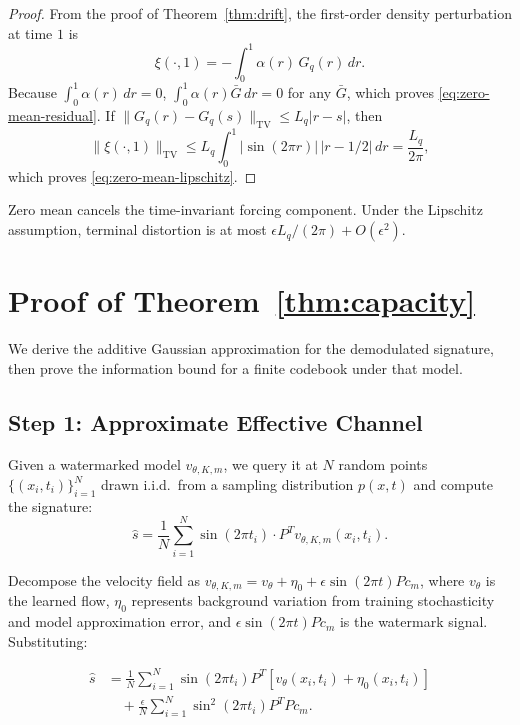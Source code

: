 \documentclass[11pt]{article}
\newcommand{\TV}{\mathrm{TV}}
\begin{document}
\begin{proof}
From the proof of Theorem~\ref{thm:drift}, the first-order density
perturbation at time $1$ is
\begin{equation}
\xi(\cdot,1)
=
-\int_0^1 \alpha(r)\,
G_q(r)\,dr .
\end{equation}
Because $\int_0^1\alpha(r)\,dr=0$,
$\int_0^1\alpha(r)\bar G\,dr=0$ for any $\bar G$, which proves
\eqref{eq:zero-mean-residual}. If
$\|G_q(r)-G_q(s)\|_{\TV}\le L_q|r-s|$, then
\[
\|\xi(\cdot,1)\|_{\TV}
\le
L_q\int_0^1 |\sin(2\pi r)|\,|r-1/2|\,dr
= \frac{L_q}{2\pi},
\]
which proves \eqref{eq:zero-mean-lipschitz}.
\end{proof}

Zero mean cancels the time-invariant forcing component. Under the
Lipschitz assumption, terminal distortion is at most
$\epsilon L_q/(2\pi)+O(\epsilon^2)$.

\section{Proof of Theorem~\ref{thm:capacity}}
\label{app:capacity_proof}

We derive the additive Gaussian approximation for the demodulated
signature, then prove the information bound for a finite codebook
under that model.

\subsection{Step 1: Approximate Effective Channel}

Given a watermarked model $v_{\theta,K,m}$, we query it at $N$ random
points $\{(x_i, t_i)\}_{i=1}^N$ drawn i.i.d.~from a sampling distribution
$p(x,t)$ and compute the signature:
\begin{equation}
\hat{s} = \frac{1}{N}\sum_{i=1}^N \sin(2\pi t_i) \cdot P^T v_{\theta,K,m}(x_i, t_i).
\end{equation}

Decompose the velocity field as
$v_{\theta,K,m} = v_\theta + \eta_0 + \epsilon \sin(2\pi t) P c_m$,
where $v_\theta$ is the learned flow, $\eta_0$ represents background
variation from training stochasticity and model approximation error, and
$\epsilon \sin(2\pi t) P c_m$ is the watermark signal. Substituting:

\begin{align}
\hat{s} &= \frac{1}{N}\sum_{i=1}^N \sin(2\pi t_i) P^T [v_\theta(x_i,t_i) + \eta_0(x_i,t_i)] \\
        &\quad + \frac{\epsilon}{N}\sum_{i=1}^N \sin^2(2\pi t_i) P^T P c_m.
\end{align}
\end{document}
